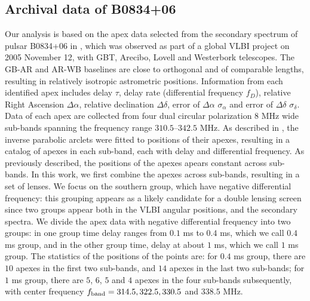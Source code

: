 \documentclass[useAMS,usenatbib]{mn2e}
\begin{document}
\subsection{Archival data of B0834+06}
\label{21}
Our analysis is based on the apex data selected from the secondary
spectrum of pulsar B0834+06 in \citep{2010ApJ...708..232B}, which was
observed as part of a global VLBI project on 2005 November 12, with
GBT, Arecibo, Lovell and Westerbork telescopes.  The GB-AR and AR-WB
baselines are close to orthogonal and of comparable lengths, resulting
in relatively isotropic astrometric positions.
Information from each identified apex includes delay $\tau$,
delay rate (differential frequency $f_D$), relative Right Ascension $\Delta\alpha$, relative declination $\Delta\delta$, error of $\Delta\alpha$ $\sigma_{\alpha}$ and error of $\Delta\delta$ $\sigma_{\delta}$. Data of each apex are collected from four dual circular polarization $8$ MHz wide sub-bands spanning the frequency range $310.5$--$342.5$ MHz. 
As described in \citet{2010ApJ...708..232B}, the inverse parabolic
arclets were fitted to positions of their apexes, resulting in a
catalog of apexes in each sub-band, each with delay and differential
frequency.  As previously described, the positions of the apexes
apears constant across sub-bands.  In this work, we first combine the
apexes across sub-bands, resulting in a set of lenses.  We focus on
the southern group, which have negative differential frequency: this
grouping appears as a likely candidate for a double lensing screen
since two groups appear both in the VLBI angular positions, and the
secondary spectra.
We divide the apex data with negative differential frequency into two groups: in one group time delay ranges from $0.1$ ms to $0.4$ ms, which we call $0.4$ ms group, and in the other group time, delay at about $1$ ms, which we call $1$ ms group. The statistics of the positions of the points are: for $0.4$ ms group, there are $10$ apexes in the first two sub-bands, and $14$ apexes in the last two sub-bands; for $1$ ms group, there are $5$, $6$, $5$ and $4$ apexes in the four sub-bands subsequently, with center frequency $f_{\rm band}=314.5, 322.5, 330.5$ and $ 338.5$ MHz. 
\end{document}
